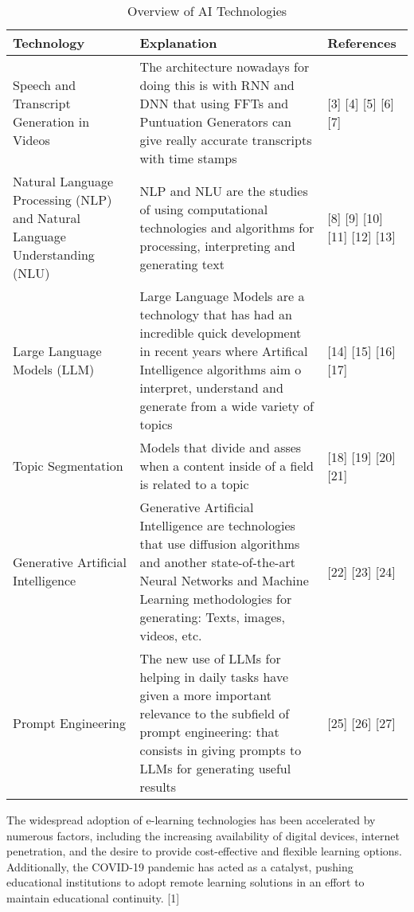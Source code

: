 \begin{table}[ht]
\centering
\begin{tabular}{ | m{4.5cm} | m{7 cm} | m{1.8cm} | }
\hline
\textbf{Technology} & \textbf{Explanation} & \textbf{References} \\ \hline
Speech and Transcript Generation in Videos & The architecture nowadays for doing this is with RNN and DNN that using FFTs and Puntuation Generators can give really accurate transcripts with time stamps & [3] [4] [5] [6] [7] \\ \hline
Natural Language Processing (NLP) and Natural Language Understanding (NLU) & NLP and NLU are the studies of using computational technologies and algorithms for processing, interpreting and generating text & [8] [9] [10] [11] [12] [13] \\ \hline
Large Language Models (LLM) & Large Language Models are a technology that has had an incredible quick development in recent years where Artifical Intelligence algorithms aim o interpret, understand and generate from a wide variety of topics & [14] [15] [16] [17] \\ \hline
Topic Segmentation & Models that divide and asses when a content inside of a field is related to a topic &  [18] [19] [20] [21] \\ \hline
Generative Artificial Intelligence & Generative Artificial Intelligence are technologies that use diffusion algorithms and another state-of-the-art Neural Networks and Machine Learning methodologies for generating: Texts, images, videos, etc. &  [22] [23] [24]  \\ \hline
Prompt Engineering & The new use of LLMs for helping in daily tasks have given a more important relevance to the subfield of prompt engineering: that consists in giving prompts to LLMs for generating useful results  & [25] [26] [27] \\ \hline
\end{tabular}
\caption{Overview of AI Technologies}
\label{table:ai_technologies}
\end{table}


The widespread adoption of e-learning technologies has been accelerated by numerous factors, including the increasing availability of digital devices, internet penetration, and the desire to provide cost-effective and flexible learning options. Additionally, the COVID-19 pandemic has acted as a catalyst, pushing educational institutions to adopt remote learning solutions in an effort to maintain educational continuity. [1]




